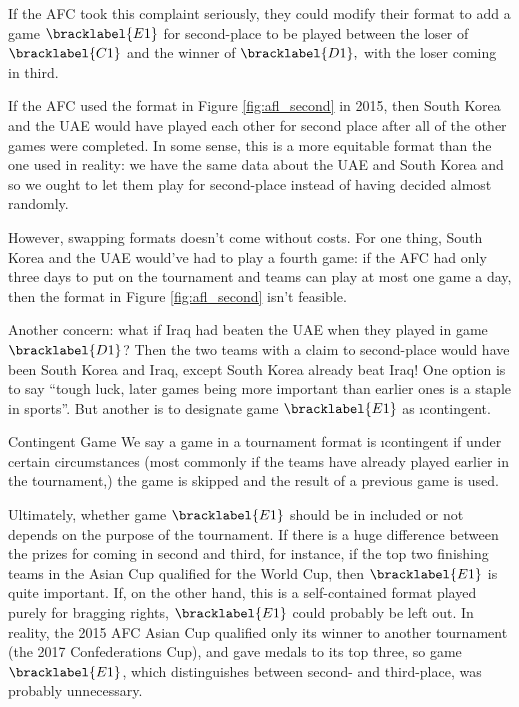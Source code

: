 {    If the AFC took this complaint seriously, they could modify their format to add a game $\bracklabel{E1}$ for second-place to be played between the loser of $\bracklabel{C1}$ and the winner of $\bracklabel{D1},$ with the loser coming in third.


    If the AFC used the format in Figure \ref{fig:afl_second} in 2015, then South Korea and the UAE would have played each other for second place after all of the other games were completed. In some sense, this is a more equitable format than the one used in reality: we have the same data about the UAE and South Korea and so we ought to let them play for second-place instead of having decided almost randomly.

    However, swapping formats doesn't come without costs. For one thing, South Korea and the UAE would've had to play a fourth game: if the AFC had only three days to put on the tournament and teams can play at most one game a day, then the format in Figure \ref{fig:afl_second} isn't feasible.

    Another concern: what if Iraq had beaten the UAE when they played in game $\bracklabel{D1}$? Then the two teams with a claim to second-place would have been South Korea and Iraq, except South Korea already beat Iraq! One option is to say ``tough luck, later games being more important than earlier ones is a staple in sports''. But another is to designate game $\bracklabel{E1}$ as \i{contingent}.

    \begin{definition}{Contingent Game}{}
        We say a game in a tournament format is \i{contingent} if under certain circumstances (most commonly if the teams have already played earlier in the tournament,) the game is skipped and the result of a previous game is used.
    \end{definition}

    Ultimately, whether game $\bracklabel{E1}$ should be in included or not depends on the purpose of the tournament. If there is a huge difference between the prizes for coming in second and third, for instance, if the top two finishing teams in the Asian Cup qualified for the World Cup, then $\bracklabel{E1}$ is quite important. If, on the other hand, this is a self-contained format played purely for bragging rights, $\bracklabel{E1}$ could probably be left out. In reality, the 2015 AFC Asian Cup qualified only its winner to another tournament (the 2017 Confederations Cup), and gave medals to its top three, so game $\bracklabel{E1}$, which distinguishes between second- and third-place, was probably unnecessary.

}
